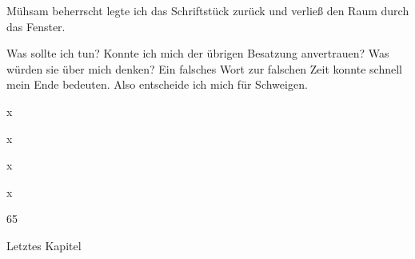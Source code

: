 Mühsam beherrscht legte ich das Schriftstück zurück und verließ den Raum durch das Fenster.

Was sollte ich tun? Konnte ich mich der übrigen Besatzung anvertrauen? Was würden sie über mich denken? Ein falsches Wort zur falschen Zeit konnte schnell mein Ende bedeuten. Also entscheide ich mich für Schweigen.

\vspace{0.5cm}\noindent

{\label{60x}\vspace{0.5cm}\noindent\LARGE x}
\renewcommand{\storychapter}{x}


{\label{61x}\vspace{0.5cm}\noindent\LARGE x}
\renewcommand{\storychapter}{x}


{\label{62x}\vspace{0.5cm}\noindent\LARGE x}
\renewcommand{\storychapter}{x}


{\label{63x}\vspace{0.5cm}\noindent\LARGE x}
\renewcommand{\storychapter}{x}


{\label{6465}\vspace{0.5cm}\noindent\LARGE 65}
\renewcommand{\storychapter}{65}


{\label{65Letztes Kapitel}\vspace{0.5cm}\noindent\LARGE Letztes Kapitel}
\renewcommand{\storychapter}{Letztes Kapitel}